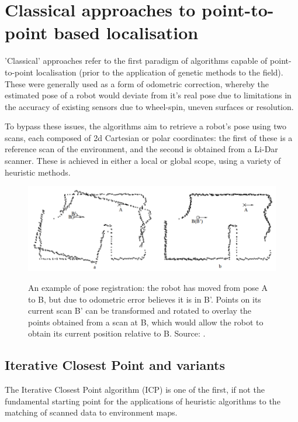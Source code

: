 \documentclass[authoryearcitations]{UoYCSproject}
\begin{document}
\section{Classical approaches to point-to-point based localisation}
\label{sec:classical_approaches}

'Classical' approaches refer to the first paradigm of algorithms capable of point-to-point localisation (prior to the application of genetic methods to the field). These were generally used as a form of odometric correction, whereby the estimated pose of a robot would deviate from it's real pose due to limitations in the accuracy of existing sensors due to wheel-spin, uneven surfaces or resolution.
\newline

To bypass these issues, the algorithms aim to retrieve a robot's pose using two scans, each composed of 2d Cartesian or polar coordinates: the first of these is a reference scan of the environment, and the second is obtained from a Li-Dar scanner. These is achieved in either a local or global scope, using a variety of heuristic methods.

\begin{figure}[ht]
	\centering
	\includegraphics[width=\textwidth,keepaspectratio]{images/pose_estimation2.png}
	\label{fig:pose_estimation}
	\caption[An example of pose registration]{An example of pose registration: the robot has moved from pose A to B, but due to odometric error believes it is in B'. Points on its current scan B' can be transformed and rotated to overlay the points obtained from a scan at B, which would allow the robot to obtain its current position relative to B. Source: \citet{Lu1997-zv}.}
\end{figure}

\subsection{Iterative Closest Point and variants}
\label{subsec:ICP}
The Iterative Closest Point algorithm (ICP) is one of the first, if not the fundamental starting point for the applications of heuristic algorithms to the matching of scanned data to environment maps. \newline
\end{document}
